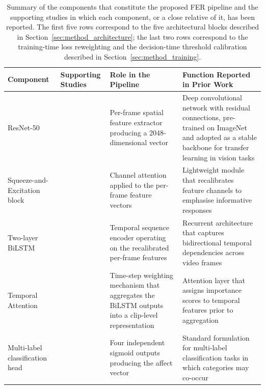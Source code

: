 \begin{table}[H]
\centering
\small
\setlength{\tabcolsep}{4pt}
\renewcommand{\arraystretch}{1.2}
\caption{Summary of the components that constitute the proposed \ac{FER} pipeline and the supporting studies in which each component, or a close relative of it, has been reported. The first five rows correspond to the five architectural blocks described in Section~\ref{sec:method_architecture}; the last two rows correspond to the training-time loss reweighting and the decision-time threshold calibration described in Section~\ref{sec:method_training}.}
\label{tab:fer_architecture_motivation}
\begin{tabular}{>{\RaggedRight\arraybackslash}p{2.8cm}
                >{\RaggedRight\arraybackslash}p{3.0cm}
                >{\RaggedRight\arraybackslash}p{3.5cm}
                >{\RaggedRight\arraybackslash}p{5.0cm}}
\toprule
\textbf{Component} & \textbf{Supporting Studies} & \textbf{Role in the Pipeline} & \textbf{Function Reported in Prior Work} \\
\midrule
ResNet-50 &
\cite{he_resnet_2016,aly_revolutionizing_2025} &
Per-frame spatial feature extractor producing a 2048-dimensional vector &
Deep convolutional network with residual connections, pre-trained on ImageNet and adopted as a stable backbone for transfer learning in vision tasks \\

Squeeze-and-Excitation block &
\cite{hu_squeeze_2018,aly_revolutionizing_2025,liu_dynamic_2026} &
Channel attention applied to the per-frame feature vectors &
Lightweight module that recalibrates feature channels to emphasise informative responses \\

Two-layer \ac{BiLSTM} &
\cite{hochreiter_lstm_1997,tulsani_realtime_2025} &
Temporal sequence encoder operating on the recalibrated per-frame features &
Recurrent architecture that captures bidirectional temporal dependencies across video frames \\

Temporal Attention &
\cite{vaswani_attention_2017,mehta_three-dimensional_2022,su_leveraging_2024} &
Time-step weighting mechanism that aggregates the \ac{BiLSTM} outputs into a clip-level representation &
Attention layer that assigns importance scores to temporal features prior to aggregation \\

Multi-label classification head &
\cite{gupta_daisee_2016,rianto_engagement_2025} &
Four independent sigmoid outputs producing the affect vector &
Standard formulation for multi-label classification tasks in which categories may co-occur \\


\end{tabular}
\end{table}
